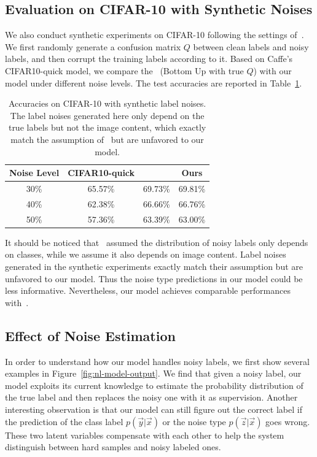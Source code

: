 \subsection{Evaluation on CIFAR-10 with Synthetic Noises} %
\label{sub:nl-evaluation-on-synthetic-dataset}
We also conduct synthetic experiments on CIFAR-10 following the settings of~\cite{sukhbaatar2014learning}. We first randomly generate a confusion matrix $Q$ between clean labels and noisy labels, and then corrupt the training labels according to it. Based on Caffe's CIFAR10-quick model, we compare the~\cite{sukhbaatar2014learning} (Bottom Up with true $Q$) with our model under different noise levels. The test accuracies are reported in Table~\ref{tab:nl-accuracy-synthetic}.

\begin{table}
\begin{center}
\begin{tabular}{c|c|c|c}
\hline
Noise Level & CIFAR10-quick & \cite{sukhbaatar2014learning} & Ours \\
\hline\hline
30\% & 65.57\% & 69.73\% & 69.81\% \\
\hline
40\% & 62.38\% & 66.66\% & 66.76\% \\
\hline
50\% & 57.36\% & 63.39\% & 63.00\% \\
\hline
\end{tabular}
\end{center}
\caption{Accuracies on CIFAR-10 with synthetic label noises. The label noises generated here only depend on the true labels but not the image content, which exactly match the assumption of~\cite{sukhbaatar2014learning} but are unfavored to our model.}
\label{tab:nl-accuracy-synthetic}
\end{table}

It should be noticed that~\cite{sukhbaatar2014learning} assumed the distribution of noisy labels only depends on classes, while we assume it also depends on image content. Label noises generated in the synthetic experiments exactly match their assumption but are unfavored to our model. Thus the noise type predictions in our model could be less informative. Nevertheless, our model achieves comparable performances with~\cite{sukhbaatar2014learning}.


\subsection{Effect of Noise Estimation} %
\label{sub:nl-effect-of-noise-estimation}
In order to understand how our model handles noisy labels, we first show several examples in Figure~\ref{fig:nl-model-output}. We find that given a noisy label, our model exploits its current knowledge to estimate the probability distribution of the true label and then replaces the noisy one with it as supervision. Another interesting observation is that our model can still figure out the correct label if the prediction of the class label $p(\vec{y}|\vec{x})$ or the noise type $p(\vec{z}|\vec{x})$ goes wrong. These two latent variables compensate with each other to help the system distinguish between hard samples and noisy labeled ones.


